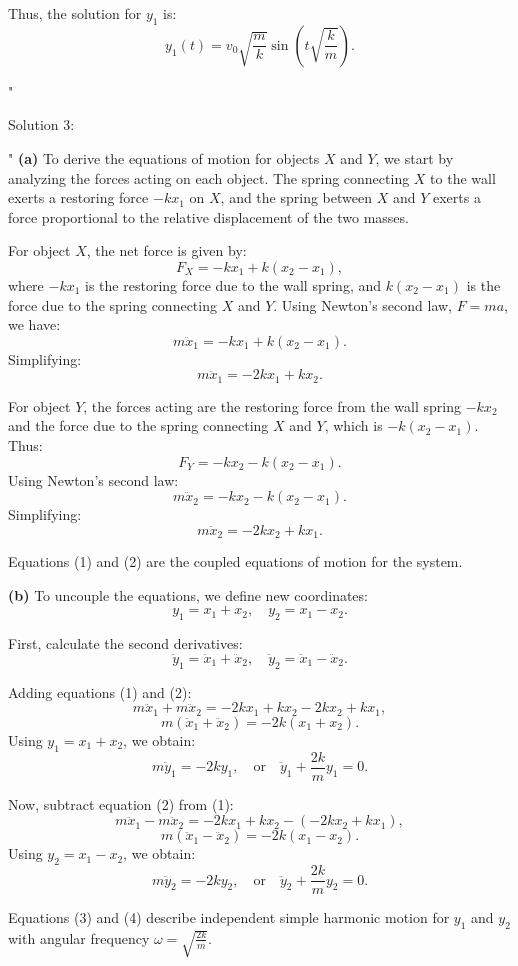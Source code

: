 Thus, the solution for $y_1$ is:
\[
\boxed{y_1(t) = v_0 \sqrt{\frac{m}{k}} \sin\left(t \sqrt{\frac{k}{m}}\right).}
\]

"

Solution 3:

"
\textbf{(a)} To derive the equations of motion for objects $X$ and $Y$, we start by analyzing the forces acting on each object. The spring connecting $X$ to the wall exerts a restoring force $-kx_1$ on $X$, and the spring between $X$ and $Y$ exerts a force proportional to the relative displacement of the two masses. 

For object $X$, the net force is given by:
\[
F_X = -kx_1 + k(x_2 - x_1),
\]
where $-kx_1$ is the restoring force due to the wall spring, and $k(x_2 - x_1)$ is the force due to the spring connecting $X$ and $Y$. Using Newton's second law, $F = ma$, we have:
\[
m\ddot{x}_1 = -kx_1 + k(x_2 - x_1).
\]
Simplifying:
\[
m\ddot{x}_1 = -2kx_1 + kx_2. \tag{1}
\]

For object $Y$, the forces acting are the restoring force from the wall spring $-kx_2$ and the force due to the spring connecting $X$ and $Y$, which is $-k(x_2 - x_1)$. Thus:
\[
F_Y = -kx_2 - k(x_2 - x_1).
\]
Using Newton's second law:
\[
m\ddot{x}_2 = -kx_2 - k(x_2 - x_1).
\]
Simplifying:
\[
m\ddot{x}_2 = -2kx_2 + kx_1. \tag{2}
\]

Equations (1) and (2) are the coupled equations of motion for the system.

\vspace{0.5cm}

\textbf{(b)} To uncouple the equations, we define new coordinates:
\[
y_1 = x_1 + x_2, \quad y_2 = x_1 - x_2.
\]

First, calculate the second derivatives:
\[
\ddot{y}_1 = \ddot{x}_1 + \ddot{x}_2, \quad \ddot{y}_2 = \ddot{x}_1 - \ddot{x}_2.
\]

Adding equations (1) and (2):
\[
m\ddot{x}_1 + m\ddot{x}_2 = -2kx_1 + kx_2 - 2kx_2 + kx_1,
\]
\[
m(\ddot{x}_1 + \ddot{x}_2) = -2k(x_1 + x_2).
\]
Using $y_1 = x_1 + x_2$, we obtain:
\[
m\ddot{y}_1 = -2ky_1, \quad \text{or} \quad \ddot{y}_1 + \frac{2k}{m}y_1 = 0. \tag{3}
\]

Now, subtract equation (2) from (1):
\[
m\ddot{x}_1 - m\ddot{x}_2 = -2kx_1 + kx_2 - (-2kx_2 + kx_1),
\]
\[
m(\ddot{x}_1 - \ddot{x}_2) = -2k(x_1 - x_2).
\]
Using $y_2 = x_1 - x_2$, we obtain:
\[
m\ddot{y}_2 = -2ky_2, \quad \text{or} \quad \ddot{y}_2 + \frac{2k}{m}y_2 = 0. \tag{4}
\]

Equations (3) and (4) describe independent simple harmonic motion for $y_1$ and $y_2$ with angular frequency $\omega = \sqrt{\frac{2k}{m}}$.

